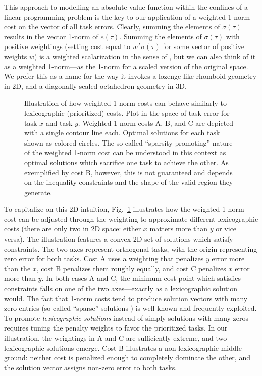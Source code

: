 \documentclass[utf8]{frontiersSCNS}
\renewcommand*{\cite}[1]{\citep{#1}}
\begin{document}
This approach to modelling an absolute value function within the confines of a linear programming problem is the key to our application of a weighted 1-norm cost on the vector of all task errors. Clearly, summing the elements of $\sigma(\tau)$ results in the vector 1-norm of $e(\tau)$. Summing the elements of $\sigma(\tau)$ with positive weightings (setting cost equal to $w^T\sigma(\tau)$ for some vector of positive weights $w$) is a weighted scalarization in the sense of \cite{BouyarmaneKheddar2017TAC}, but we can also think of it as a weighted 1-norm---as the 1-norm for a scaled version of the original space. We prefer this as a name for the way it invokes a lozenge-like rhomboid geometry in 2D, and a diagonally-scaled octahedron geometry in 3D.


\begin{figure}\centering\footnotesize
	\def\svgwidth{.5\columnwidth}
	
	\caption{Illustration of how weighted 1-norm costs can behave similarly to lexicographic (prioritized) costs. Plot in the space of task error for task-$x$ and task-$y$. Weighted 1-norm costs A, B, and C are depicted with a single contour line each. Optimal solutions for each task shown as colored circles. The so-called ``sparsity promoting'' nature of the weighted 1-norm cost can be understood in this context as optimal solutions which sacrifice one task to achieve the other. As exemplified by cost B, however, this is not guaranteed and depends on the inequality constraints and the shape of the valid region they generate. }\label{fig:onpwbc}
\end{figure}



To capitalize on this 2D intuition, Fig.~\ref{fig:onpwbc} illustrates how the weighted 1-norm cost can be adjusted through the weighting to approximate different lexicographic costs (there are only two in 2D space: either $x$ matters more than $y$ or vice versa). The illustration features a convex 2D set of solutions which satisfy constraints. The two axes represent orthogonal tasks, with the origin representing zero error for both tasks. Cost A uses a weighting that penalizes $y$ error more than the $x$, cost B penalizes them roughly equally, and cost C penalizes $x$ error more than $y$. In both cases A and C, the minimum cost point which satisfies constraints falls on one of the two axes---exactly as a lexicographic solution would. The fact that 1-norm costs tend to produce solution vectors with many zero entries (so-called ``sparse'' solutions \cite{CandesWakinBoyd2008JFAA}) is well known and frequently exploited. To promote \emph{lexicographic solutions} instead of simply solutions with many zeros requires tuning the penalty weights to favor the prioritized tasks. 
In our illustration, the weightings in A and C are sufficiently extreme, and two lexicographic solutions emerge.
Cost B illustrates a non-lexicographic middle-ground: neither cost is penalized enough to completely dominate the other, and the solution vector assigns non-zero error to both tasks.
\end{document}
